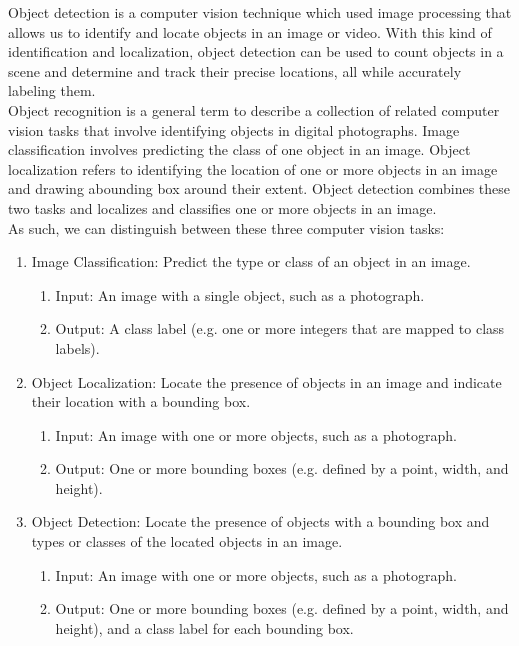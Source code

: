 Object detection \cite{8627998} is a computer vision technique which used image processing that allows us to identify and locate objects in an image or video. With this kind of identification and localization, object detection can be used to count objects in a scene and determine and track their precise locations, all while accurately labeling them.\\
Object recognition is a general term to describe a collection of related computer vision tasks that involve identifying objects in digital photographs.
Image classification involves predicting the class of one object in an image. Object localization refers to identifying the location of one or more objects in an image and drawing abounding box around their extent. Object detection combines these two tasks and localizes and classifies one or more objects in an image.\\
As such, we can distinguish between these three computer vision tasks:
\begin{enumerate}
\item Image Classification: Predict the type or class of an object in an image.
\begin{enumerate}
    \item Input: An image with a single object, such as a photograph.
    \item Output: A class label (e.g. one or more integers that are mapped to class labels).
\end{enumerate}
\item Object Localization: Locate the presence of objects in an image and indicate their location with a bounding box.
\begin{enumerate}
    \item Input: An image with one or more objects, such as a photograph.
    \item Output: One or more bounding boxes (e.g. defined by a point, width, and height).
\end{enumerate}
\item Object Detection: Locate the presence of objects with a bounding box and types or classes of the located objects in an image.
\begin{enumerate}
    \item Input: An image with one or more objects, such as a photograph.
    \item Output: One or more bounding boxes (e.g. defined by a point, width, and height), and a class label for each bounding box.
\end{enumerate}
\end{enumerate}
